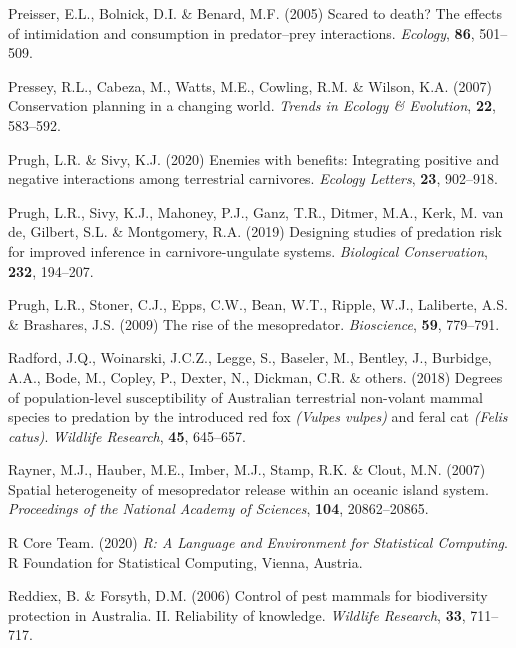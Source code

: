 \documentclass[11pt,a4paper,titlepage,twoside,openright]{style/unimelbthesis}
\begin{document}
\begin{mainmatter}
\leavevmode\hypertarget{ref-preisser2005scared}{}%
Preisser, E.L., Bolnick, D.I. \& Benard, M.F. (2005) Scared to death? The effects of intimidation and consumption in predator--prey interactions. \emph{Ecology}, \textbf{86}, 501--509.

\leavevmode\hypertarget{ref-pressey2007conservation}{}%
Pressey, R.L., Cabeza, M., Watts, M.E., Cowling, R.M. \& Wilson, K.A. (2007) Conservation planning in a changing world. \emph{Trends in Ecology \& Evolution}, \textbf{22}, 583--592.

\leavevmode\hypertarget{ref-prugh2020enemies}{}%
Prugh, L.R. \& Sivy, K.J. (2020) Enemies with benefits: Integrating positive and negative interactions among terrestrial carnivores. \emph{Ecology Letters}, \textbf{23}, 902--918.

\leavevmode\hypertarget{ref-prugh2019designing}{}%
Prugh, L.R., Sivy, K.J., Mahoney, P.J., Ganz, T.R., Ditmer, M.A., Kerk, M. van de, Gilbert, S.L. \& Montgomery, R.A. (2019) Designing studies of predation risk for improved inference in carnivore-ungulate systems. \emph{Biological Conservation}, \textbf{232}, 194--207.

\leavevmode\hypertarget{ref-prugh2009rise}{}%
Prugh, L.R., Stoner, C.J., Epps, C.W., Bean, W.T., Ripple, W.J., Laliberte, A.S. \& Brashares, J.S. (2009) The rise of the mesopredator. \emph{Bioscience}, \textbf{59}, 779--791.

\leavevmode\hypertarget{ref-radford2018degrees}{}%
Radford, J.Q., Woinarski, J.C.Z., Legge, S., Baseler, M., Bentley, J., Burbidge, A.A., Bode, M., Copley, P., Dexter, N., Dickman, C.R. \& others. (2018) Degrees of population-level susceptibility of Australian terrestrial non-volant mammal species to predation by the introduced red fox \emph{(Vulpes vulpes)} and feral cat \emph{(Felis catus)}. \emph{Wildlife Research}, \textbf{45}, 645--657.

\leavevmode\hypertarget{ref-rayner2007spatial}{}%
Rayner, M.J., Hauber, M.E., Imber, M.J., Stamp, R.K. \& Clout, M.N. (2007) Spatial heterogeneity of mesopredator release within an oceanic island system. \emph{Proceedings of the National Academy of Sciences}, \textbf{104}, 20862--20865.

\leavevmode\hypertarget{ref-R}{}%
R Core Team. (2020) \emph{R: A Language and Environment for Statistical Computing}. R Foundation for Statistical Computing, Vienna, Austria.

\leavevmode\hypertarget{ref-reddiex2006control}{}%
Reddiex, B. \& Forsyth, D.M. (2006) Control of pest mammals for biodiversity protection in Australia. II. Reliability of knowledge. \emph{Wildlife Research}, \textbf{33}, 711--717.


\end{mainmatter}
\end{document}
